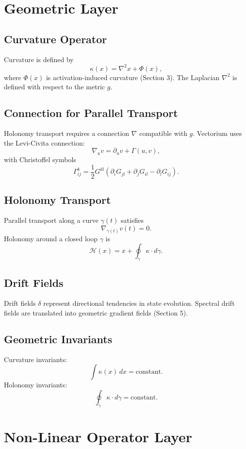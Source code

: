 \documentclass[11pt]{article}
\begin{document}
\section{Geometric Layer}

\subsection{Curvature Operator}
Curvature is defined by
\[
\kappa(x) = \nabla^2 x + \Phi(x),
\]
where $\Phi(x)$ is activation-induced curvature (Section 3). The Laplacian
$\nabla^2$ is defined with respect to the metric $g$.

\subsection{Connection for Parallel Transport}
Holonomy transport requires a connection $\nabla$ compatible with $g$. Vectorium
uses the Levi-Civita connection:
\[
\nabla_u v = \partial_u v + \Gamma(u, v),
\]
with Christoffel symbols
\[
\Gamma^k_{ij} = \frac{1}{2} G^{kl}
\left(
\partial_i G_{jl}
+ \partial_j G_{il}
- \partial_l G_{ij}
\right).
\]

\subsection{Holonomy Transport}
Parallel transport along a curve $\gamma(t)$ satisfies
\[
\nabla_{\dot{\gamma}(t)} v(t) = 0.
\]
Holonomy around a closed loop $\gamma$ is
\[
\mathcal{H}(x) = x + \oint_{\gamma} \kappa \cdot d\gamma.
\]

\subsection{Drift Fields}
Drift fields $\delta$ represent directional tendencies in state evolution.
Spectral drift fields are translated into geometric gradient fields (Section 5).

\subsection{Geometric Invariants}
Curvature invariants:
\[
\int \kappa(x) \, dx = \text{constant}.
\]
Holonomy invariants:
\[
\oint_{\gamma} \kappa \cdot d\gamma = \text{constant}.
\]

\section{Non-Linear Operator Layer}
\end{document}

